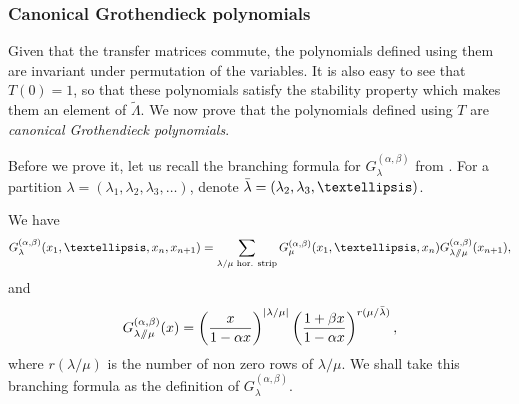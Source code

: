 \documentclass[ALCO, Unicode]{cedram}
\newcommand{\sslash}{\mathbin{/\mkern-6mu/}}
\newcommand\Gg{{G^{(\alpha,\beta)}_{\lambda}}}
\begin{document}
\subsubsection{Canonical Grothendieck polynomials}
Given that the transfer matrices commute, the polynomials defined using them are invariant under permutation of the variables. It is also easy to see that $T(0)=1$, so that these polynomials satisfy the stability property which makes them an element of $\tilde\Lambda$. We now prove that the polynomials defined using $T$ are \emph{canonical Grothendieck polynomials}.

Before we prove it, let us recall the branching formula for $\Gg$ from  \cite[Proposition~8.8]{canon-groth}. For a partition $\lambda=(\lambda_1,\lambda_2,\lambda_3,\dots)$, denote $\Bar{\lambda}=(\lambda_2,\lambda_3,\dots)$.

We have
\begin{align}
\label{branchG}
\Gg(x_1,\dots,x_n,x_{n+1})= \sum_{\lambda/\mu  \text{ hor. strip}}  G^{(\alpha,\beta)}_{\mu}(x_1,\dots,x_n) G^{(\alpha,\beta)}_{\lambda\sslash\mu}(x_{n+1}),
\end{align}
and
\begin{align}
\label{singleG}
G^{(\alpha,\beta)}_{\lambda\sslash\mu}(x)= 
\left(
\frac{x}{1-\alpha x}
\right)^{|\lambda/\mu|}
\left(
\frac{1+\beta x}{1-\alpha x}
\right)^{r(\mu/\Bar{\lambda})},
\end{align}
where $r(\lambda/\mu)$ is the number of non zero rows of $\lambda/\mu$. We shall take this branching formula as the definition of $G^{(\alpha,\beta)}_{\lambda}$.
\end{document}
